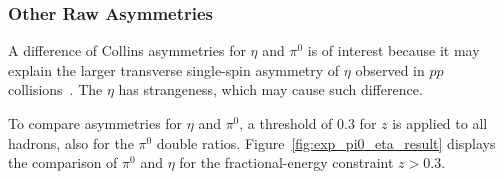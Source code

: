 \subsubsection{\texorpdfstring{Other Raw Asymmetries}{Other Raw Asymmetries}}

A difference of Collins asymmetries for $\eta$ and $\pi^0$ is of interest because it may explain the larger transverse single-spin asymmetry of $\eta$ observed in $pp$ collisions~\cite{StarTSSA2}. The $\eta$ has strangeness, which may cause such difference.
 
To compare asymmetries for $\eta$ and $\pi^0$, a threshold of $0.3$ for $z$ is applied to all hadrons, also for the $\pi^0$ double ratios. Figure~\ref{fig:exp_pi0_eta_result} displays  the comparison of $\pi^0$ and $\eta$ for the fractional-energy constraint $z>0.3$. 


